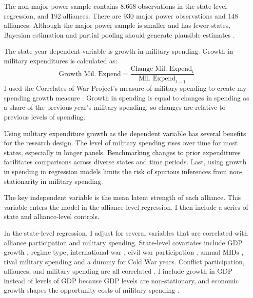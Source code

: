 \documentclass[12pt]{article}
\begin{document}
The non-major power sample contains 8,668 observations in the state-level regression, and 192 alliances. 
There are 930 major power observations and 148 alliances. 
Although the major power sample is smaller and has fewer states, Bayesian estimation and partial pooling should generate plausible estimates \citep{Stegmueller2013}. 


The state-year dependent variable is growth in military spending.
Growth in military expenditures is calculated as:
\begin{equation}
\mbox{Growth Mil. Expend} = \frac{ \mbox{Change Mil. Expend}_t }{ \mbox{Mil. Expend}_{t-1} }
\end{equation} 
I used the Correlates of War Project's measure of military spending to create my spending growth measure \citep{SingerCINC1988}. 
Growth in spending is equal to changes in spending as a share of the previous year's military spending, so changes are relative to previous levels of spending. 


Using military expenditure growth as the dependent variable has several benefits for the research design. 
The level of military spending rises over time for most states, especially in longer panels. 
Benchmarking changes to prior expenditures facilitates comparisons across diverse states and time periods. 
Last, using growth in spending in regression models limits the risk of spurious inferences from non-stationarity in military spending.


The key independent variable is the mean latent strength of each alliance. 
This variable enters the model in the alliance-level regression. 
I then include a series of state and alliance-level controls. 


In the state-level regression, I adjust for several variables that are correlated with alliance participation and military spending. 
State-level covariates include GDP growth \citep{Boltetal2018}, regime type, international war \citep{Reiteretal2016}, civil war participation \citep{SarkeesWayman2010}, annual MIDs \citep{Gibleretal2016}, rival military spending \citep{ThompsonDreyer2012} and a dummy for Cold War years.
Conflict participation, alliances, and military spending are all correlated \citep{SeneseVasquez2008}. 
I include growth in GDP instead of levels of GDP because GDP levels are non-stationary, and economic growth shapes the opportunity costs of military spending \citep{Kimball2010, Zielinskietal2017}.
\end{document}
